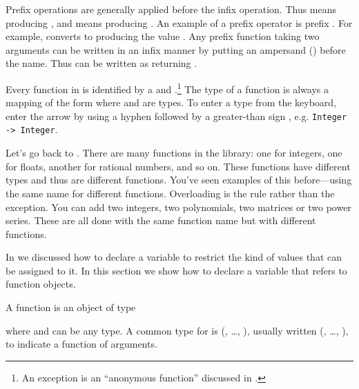 Prefix operations are generally applied before the infix operation.
Thus  means  producing
, and
 means  producing .
An example of a prefix operator is prefix \spadop{-}.
For example,  converts to  producing
the value .
Any prefix function taking two arguments can be written in
an infix manner by putting an
ampersand (\spadSyntax{&}) before the name.
Thus  can be written as
 returning .

Every function in \Language{} is identified by
a  and .\footnote{An exception is
an ``anonymous function''
discussed in
.}
The type of a function is always a mapping of the form
where  and  are types.
To enter a type from the keyboard, enter the arrow by using
a hyphen \spadSyntax{-} followed by a greater-than sign
\spadSyntax{>}, e.g. {\tt Integer -> Integer}.

Let's go back to \spadop{+}.
There are many \spadop{+} functions in the
\Language{} library: one for integers, one for floats, another for
rational numbers, and so on.
These \spadop{+} functions have different types and thus are
different functions.
You've seen examples of this 
before---using the same name for different functions.
Overloading is the rule rather than the exception.
You can add two integers, two polynomials, two matrices or
two power series.
These are all done with the same function name
but with different functions.


In  we discussed how to declare a variable
to restrict the kind of values that can be assigned to it.
In this section we show how to declare a variable that refers to
function objects.

\beginImportant
A function is an object of type
\begin{center}
\end{center}
where  and  can be any type.
A common type for  is
(, \ldots, ),
usually written
(, \ldots, ),
to indicate a function of  arguments.
\endImportant

